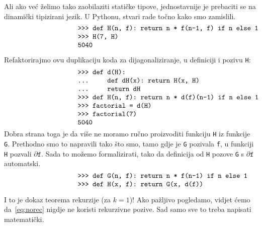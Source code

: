 Ali ako već želimo tako zaobilaziti statičke tipove, jednostavnije je prebaciti se na dinamički tipizirani jezik. U Pythonu, stvari rade točno kako smo zamislili.
\begin{equation}\begin{minipage}{0.8\textwidth}
\begin{verbatim}
            >>> def H(n, f): return n * f(n-1, f) if n else 1
            >>> H(7, H)
            5040
\end{verbatim}
\end{minipage}\end{equation}

Refaktorirajmo ovu duplikaciju koda za dijagonaliziranje, u definiciji i pozivu \texttt H:
\begin{equation}\begin{minipage}{0.8\textwidth}
\begin{verbatim}
            >>> def d(H):
            ...     def dH(x): return H(x, H)
            ...     return dH
            >>> def H(n, f): return n * d(f)(n-1) if n else 1
            >>> factorial = d(H)
            >>> factorial(7)
            5040
\end{verbatim}
\end{minipage}\end{equation}
Dobra strana toga je da više ne moramo ručno proizvoditi funkciju \texttt H iz funkcije \texttt G. Prethodno smo to napravili tako što smo, tamo gdje je \texttt G pozivala \texttt f, u funkciji \texttt H pozvali $\partial\texttt f$. Sada to možemo formalizirati, tako da definicija od \texttt H pozove \texttt G s $\partial\texttt f$ automatski.
\begin{equation}\label{eq:norec}\begin{minipage}{0.8\textwidth}
\begin{verbatim}
            >>> def G(n, f): return n * f(n-1) if n else 1
            >>> def H(x, f): return G(x, d(f))
\end{verbatim}
\end{minipage}\end{equation}

I to je dokaz teorema rekurzije (za $k=1$)! Ako pažljivo pogledamo, vidjet ćemo da~\eqref{eq:norec} nigdje ne koristi rekurzivne pozive. Sad samo sve to treba napisati matematički.

